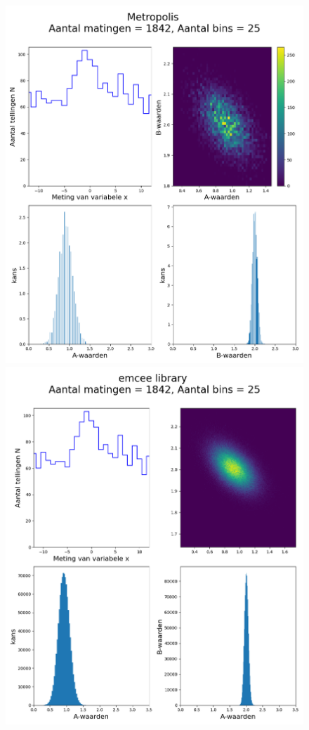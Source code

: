 \begin{figure}
\begin{minipage}{0.98\linewidth}
        \includegraphics[width=0.95\linewidth]{Figures/signaal_AB_samples_100000.png}
        \label{fig:AB-metropolis}
        \includegraphics[width=0.95\linewidth]{Figures/emcee_hist_AB.png}

\end{minipage}
\end{figure}
